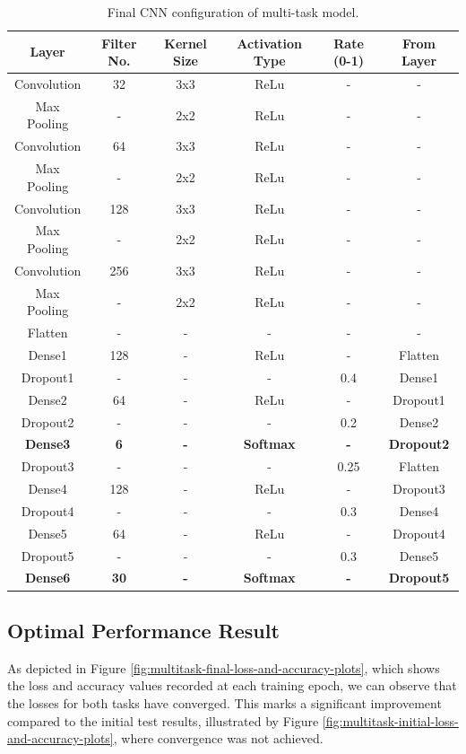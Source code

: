 \documentclass{l4proj}
\begin{document}
\begin{table}[h]
    \centering
    \begin{tabular}{cccccc}
        \toprule
        \textbf{Layer} & \textbf{Filter No.} & \textbf{Kernel Size} & \textbf{Activation Type} & \textbf{Rate (0-1)} & \textbf{From Layer}\\
        \midrule
        \midrule
        Convolution & 32  & 3x3 & ReLu & - & -\\
        Max Pooling & - & 2x2 & ReLu & - & -\\
        Convolution & 64 & 3x3 & ReLu & - & -\\
        Max Pooling & - & 2x2 & ReLu & - & -\\
        Convolution & 128 & 3x3 & ReLu & - & -\\
        Max Pooling & - & 2x2 & ReLu & - & -\\
        Convolution & 256 & 3x3 & ReLu & - & -\\
        Max Pooling & - & 2x2 & ReLu & - & -\\
        Flatten & - & - & - & - & -\\
        Dense1 & 128 & - & ReLu & - & Flatten\\
        Dropout1 & - & - & - & 0.4 & Dense1\\
        Dense2 & 64 & - & ReLu & - & Dropout1\\
        Dropout2 & - & - & - & 0.2 & Dense2\\
        \textbf{Dense3} & \textbf{6} & \textbf{-} & \textbf{Softmax} & \textbf{-} & \textbf{Dropout2} \\
        Dropout3 & - & - & - & 0.25 & Flatten\\
        Dense4 & 128 & - & ReLu & - & Dropout3\\
        Dropout4 & - & - & - & 0.3 & Dense4\\
        Dense5 & 64 & - & ReLu & - & Dropout4\\
        Dropout5 & - & - & - & 0.3 & Dense5\\
        \textbf{Dense6} & \textbf{30} & \textbf{-} & \textbf{Softmax} & \textbf{-} & \textbf{Dropout5} \\
        \bottomrule
    \end{tabular}
    \caption{Final CNN configuration of multi-task model.}
    \label{tab:multitask-final-CNN-configuration}
\end{table}

\subsection{Optimal Performance Result}
As depicted in Figure \ref{fig:multitask-final-loss-and-accuracy-plots}, which shows the loss and accuracy values recorded at each training epoch, we can observe that the losses for both tasks have converged. This marks a significant improvement compared to the initial test results, illustrated by Figure \ref{fig:multitask-initial-loss-and-accuracy-plots}, where convergence was not achieved.
\end{document}
